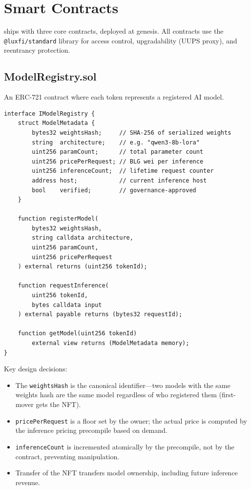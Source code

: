 \section{Smart Contracts}
\label{sec:contracts}

\Beluga{} ships with three core contracts, deployed at genesis. All contracts use the \texttt{@luxfi/standard} library \cite{lux-standard} for access control, upgradability (UUPS proxy), and reentrancy protection.

\subsection{ModelRegistry.sol}

An ERC-721 contract where each token represents a registered AI model.

\begin{lstlisting}[language=Solidity,caption=ModelRegistry core interface]
interface IModelRegistry {
    struct ModelMetadata {
        bytes32 weightsHash;     // SHA-256 of serialized weights
        string  architecture;    // e.g. "qwen3-8b-lora"
        uint256 paramCount;      // total parameter count
        uint256 pricePerRequest; // BLG wei per inference
        uint256 inferenceCount;  // lifetime request counter
        address host;            // current inference host
        bool    verified;        // governance-approved
    }

    function registerModel(
        bytes32 weightsHash,
        string calldata architecture,
        uint256 paramCount,
        uint256 pricePerRequest
    ) external returns (uint256 tokenId);

    function requestInference(
        uint256 tokenId,
        bytes calldata input
    ) external payable returns (bytes32 requestId);

    function getModel(uint256 tokenId)
        external view returns (ModelMetadata memory);
}
\end{lstlisting}

Key design decisions:
\begin{itemize}[nosep]
    \item The \texttt{weightsHash} is the canonical identifier---two models with the same weights hash are the same model regardless of who registered them (first-mover gets the NFT).
    \item \texttt{pricePerRequest} is a floor set by the owner; the actual price is computed by the inference pricing precompile based on demand.
    \item \texttt{inferenceCount} is incremented atomically by the precompile, not by the contract, preventing manipulation.
    \item Transfer of the NFT transfers model ownership, including future inference revenue.
\end{itemize}

